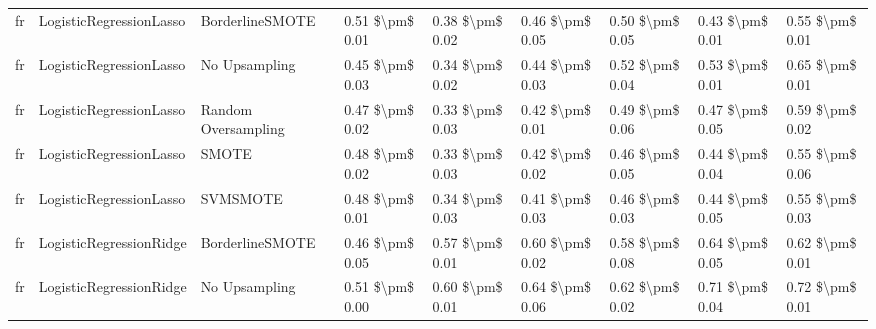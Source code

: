 \begin{tabular}{lllllllll}
      fr &         LogisticRegressionLasso &               BorderlineSMOTE &     0.51 \$\textbackslash pm\$ 0.01 &           0.38 \$\textbackslash pm\$ 0.02 &       0.46 \$\textbackslash pm\$ 0.05 &        0.50 \$\textbackslash pm\$ 0.05 &                         0.43 \$\textbackslash pm\$ 0.01 &     0.55 \$\textbackslash pm\$ 0.01 \\
      fr &         LogisticRegressionLasso &                 No Upsampling &     0.45 \$\textbackslash pm\$ 0.03 &           0.34 \$\textbackslash pm\$ 0.02 &       0.44 \$\textbackslash pm\$ 0.03 &        0.52 \$\textbackslash pm\$ 0.04 &                         0.53 \$\textbackslash pm\$ 0.01 &     0.65 \$\textbackslash pm\$ 0.01 \\
      fr &         LogisticRegressionLasso &           Random Oversampling &     0.47 \$\textbackslash pm\$ 0.02 &           0.33 \$\textbackslash pm\$ 0.03 &       0.42 \$\textbackslash pm\$ 0.01 &        0.49 \$\textbackslash pm\$ 0.06 &                         0.47 \$\textbackslash pm\$ 0.05 &     0.59 \$\textbackslash pm\$ 0.02 \\
      fr &         LogisticRegressionLasso &                         SMOTE &     0.48 \$\textbackslash pm\$ 0.02 &           0.33 \$\textbackslash pm\$ 0.03 &       0.42 \$\textbackslash pm\$ 0.02 &        0.46 \$\textbackslash pm\$ 0.05 &                         0.44 \$\textbackslash pm\$ 0.04 &     0.55 \$\textbackslash pm\$ 0.06 \\
      fr &         LogisticRegressionLasso &                      SVMSMOTE &     0.48 \$\textbackslash pm\$ 0.01 &           0.34 \$\textbackslash pm\$ 0.03 &       0.41 \$\textbackslash pm\$ 0.03 &        0.46 \$\textbackslash pm\$ 0.03 &                         0.44 \$\textbackslash pm\$ 0.05 &     0.55 \$\textbackslash pm\$ 0.03 \\
      fr &         LogisticRegressionRidge &               BorderlineSMOTE &     0.46 \$\textbackslash pm\$ 0.05 &           0.57 \$\textbackslash pm\$ 0.01 &       0.60 \$\textbackslash pm\$ 0.02 &        0.58 \$\textbackslash pm\$ 0.08 &                         0.64 \$\textbackslash pm\$ 0.05 &     0.62 \$\textbackslash pm\$ 0.01 \\
      fr &         LogisticRegressionRidge &                 No Upsampling &     0.51 \$\textbackslash pm\$ 0.00 &           0.60 \$\textbackslash pm\$ 0.01 &       0.64 \$\textbackslash pm\$ 0.06 &        0.62 \$\textbackslash pm\$ 0.02 &                         0.71 \$\textbackslash pm\$ 0.04 &     0.72 \$\textbackslash pm\$ 0.01 \\

\end{tabular}
